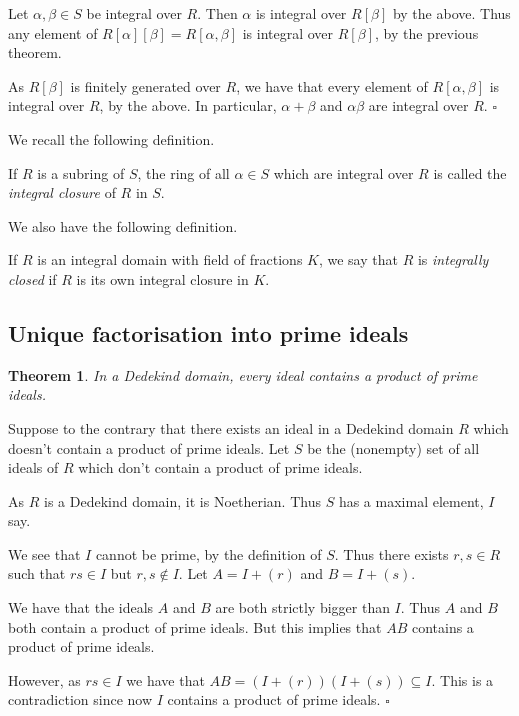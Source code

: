 \documentclass[10pt]{article}
\newcommand{\qed}{\square}
\newtheorem{theorem}{Theorem}[section]
\newenvironment{proof}[1][Proof]{\begin{trivlist}
\item[\hskip \labelsep {\bfseries #1}]}{\end{trivlist}}
\newenvironment{definition}[1][Definition]{\begin{trivlist}
\item[\hskip \labelsep {\bfseries #1}]}{\end{trivlist}}
\begin{document}
\begin{proof}
Let $\alpha, \beta \in S$ be integral over $R$. Then $\alpha$ is integral over $R[\beta]$ by the above. Thus any element of $R[\alpha][\beta] = R[\alpha, \beta]$ is integral over $R[\beta]$, by the previous theorem.

As $R[\beta]$ is finitely generated over $R$, we have that every element of $R[\alpha, \beta]$ is integral over $R$, by the above. In particular, $\alpha + \beta$ and $\alpha\beta$ are integral over $R$. $\qed$
\end{proof}

We recall the following definition.

\begin{definition}
If $R$ is a subring of $S$, the ring of all $\alpha \in S$ which are integral over $R$ is called the \emph{integral closure} of $R$ in $S$.
\end{definition}

We also have the following definition.

\begin{definition}
If $R$ is an integral domain with field of fractions $K$, we say that $R$ is \emph{integrally closed} if $R$ is its own integral closure in $K$.
\end{definition}

\subsection{Unique factorisation into prime ideals}

\begin{theorem}
In a Dedekind domain, every ideal contains a product of prime ideals.
\end{theorem}

\begin{proof}
Suppose to the contrary that there exists an ideal in a Dedekind domain $R$ which doesn't contain a product of prime ideals. Let $S$ be the (nonempty) set of all ideals of $R$ which don't contain a product of prime ideals.

As $R$ is a Dedekind domain, it is Noetherian. Thus $S$ has a maximal element, $I$ say.

We see that $I$ cannot be prime, by the definition of $S$. Thus there exists $r, s \in R$ such that $rs \in I$ but $r, s \notin I$. Let $A = I + (r)$ and $B = I + (s)$. 

We have that the ideals $A$ and $B$ are both strictly bigger than $I$. Thus $A$ and $B$ both contain a product of prime ideals. But this implies that $AB$ contains a product of prime ideals.

However, as $rs \in I$ we have that $AB = (I + (r))(I + (s)) \subseteq I$. This is a contradiction since now $I$ contains a product of prime ideals. $\qed$
\end{proof}
\end{document}
